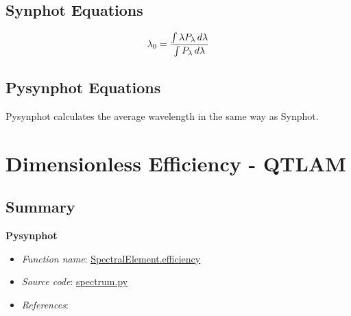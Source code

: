 \documentclass[letterpaper,10pt,english]{sphinxtsr}
\begin{document}
\section{Synphot Equations}
\label{main:id33}\begin{gather}
\begin{split}\lambda_0 = \frac{\int \lambda P_{\lambda}\,d\lambda}
             {\int P_{\lambda}\,d\lambda}\end{split}\notag
\end{gather}

\section{Pysynphot Equations}
\label{main:id34}
Pysynphot calculates the average wavelength in the same way as Synphot.


\chapter{Dimensionless Efficiency - QTLAM}
\label{main:dimensionless-efficiency-qtlam}

\section{Summary}
\label{main:id35}
\textbf{Pysynphot}
\begin{itemize}
\item {} 
\emph{Function name}: \href{https://trac.assembla.com/astrolib/browser/trunk/pysynphot/lib/pysynphot/spectrum.py\#L1131}{SpectralElement.efficiency}

\item {} 
\emph{Source code}: \href{https://trac.assembla.com/astrolib/browser/trunk/pysynphot/lib/pysynphot/spectrum.py}{spectrum.py}

\item {} 
\emph{References}:

\end{itemize}
\end{document}
